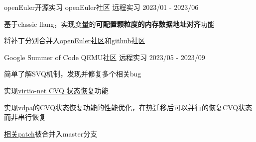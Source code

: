 \begin{cventries}
  \cventry
    {openEuler开源实习} %
    {openEuler社区} %
    {远程实习} %
    {2023/01 - 2023/06} %
    {
      \begin{cvitems} %
        \item {基于classic flang，实现变量的\textbf{可配置颗粒度的内存数据地址对齐}功能}
        \item {将补丁分别合并入\href{https://gitee.com/src-openeuler/flang/commits/master?user=yinjiawei2023}{\textcolor{awesome-skyblue}{openEuler社区}}和\href{https://github.com/flang-compiler/flang/commit/7f17301a9715e229fc19242802e1bff953967d3e}{\textcolor{awesome-skyblue}{github社区}}}
      \end{cvitems}
    }

  \cventry
    {Google Summer of Code} %
    {QEMU社区} %
    {远程实习} %
    {2023/05 - 2023/09} %
    {
      \begin{cvitems} %
        \item {简单了解SVQ机制，发现并修复多个相关bug}
        \item {实现\href{https://summerofcode.withgoogle.com/archive/2023/projects/zptoHp3v}{\textcolor{awesome-skyblue}{virtio-net CVQ 状态恢复}}功能}
        \item {实现vdpa的CVQ状态恢复功能的性能优化，在热迁移后可以并行的恢复CVQ状态而非串行恢复}
        \item {\href{https://gitlab.com/qemu-project/qemu/-/commits/master?search=Hawkins\%20Jiawei}{\textcolor{awesome-skyblue}{相关patch}}被合并入master分支}
      \end{cvitems}
    }

\end{cventries}
